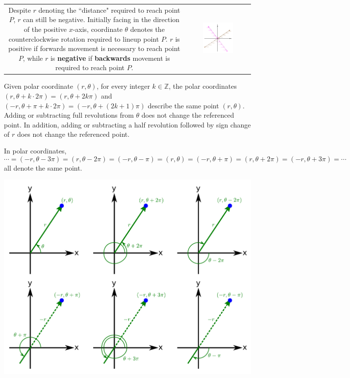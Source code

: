 \documentclass{article}
\begin{document}
\begin{tabular}{cc}
\parbox{0.5\textwidth}{
Despite \(r\) denoting the ``distance" required to reach point \(P\), \(r\) can still be negative. Initially facing in the direction of the positive \(x\)-axis, coordinate \(\theta\) denotes the counterclockwise rotation required to lineup point \(P\). \(r\) is positive if forwards movement is necessary to reach point \(P\), while \(r\) is {\bf negative} if {\bf backwards} movement is required to reach point \(P\).
} & \parbox{0.5\textwidth}{
\includegraphics[width = 0.5\textwidth]{negative_r}
}
\end{tabular}


Given polar coordinate \((r, \theta)\), for every integer \(k \in \mathbb{Z}\), the polar coordinates \((r, \theta + k \cdot 2\pi) = (r, \theta + 2 k \pi)\) and \((-r, \theta + \pi + k \cdot 2\pi) = (-r, \theta + (2k + 1)\pi)\) describe the same point \((r, \theta)\). Adding or subtracting full revolutions from \(\theta\) does not change the referenced point. In addition, adding or subtracting a half revolution followed by sign change of \(r\) does not change the referenced point.

In polar coordinates, 
\[\cdots = (-r, \theta - 3\pi) = (r, \theta - 2\pi) = (-r, \theta - \pi) = (r, \theta) = (-r, \theta + \pi) = (r, \theta + 2\pi) = (-r, \theta + 3\pi) = \cdots\]
all denote the same point. 

\includegraphics[scale = 0.65]{multiple_polar_coordinates}
\end{document}
